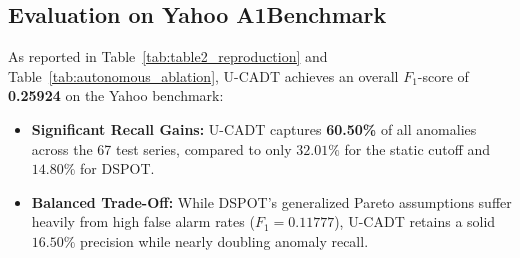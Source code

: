 \documentclass[conference]{IEEEtran}
\begin{document}
\begin{table}[t]
\centering
\caption{Empirical Audit: Autonomous Performance (No Oracle Feedback)}
\label{tab:autonomous_ablation}
\end{table}

\subsection{Evaluation on Yahoo A1Benchmark}
As reported in Table~\ref{tab:table2_reproduction} and Table~\ref{tab:autonomous_ablation}, U-CADT achieves an overall $F_1$-score of \textbf{0.25924} on the Yahoo benchmark:
\begin{itemize}
    \item \textbf{Significant Recall Gains:} U-CADT captures \textbf{60.50\%} of all anomalies across the 67 test series, compared to only $32.01\%$ for the static cutoff and $14.80\%$ for DSPOT.
    \item \textbf{Balanced Trade-Off:} While DSPOT's generalized Pareto assumptions suffer heavily from high false alarm rates ($F_1 = 0.11777$), U-CADT retains a solid $16.50\%$ precision while nearly doubling anomaly recall.
\end{itemize}
\end{document}
